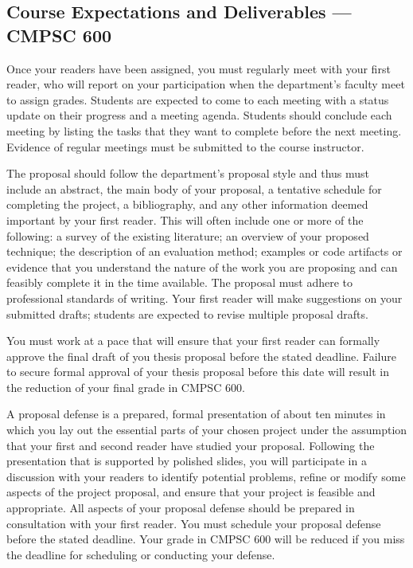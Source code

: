 \subsection*{Course Expectations and Deliverables --- CMPSC 600}

\medskip
{} Once your readers have been assigned, you must regularly meet with your first reader, who
will report on your participation when the department's faculty meet to assign grades.  Students are expected to come to
each meeting with a status update on their progress and a meeting agenda.  Students should conclude each meeting by
listing the tasks that they want to complete before the next meeting. Evidence of regular meetings must be submitted
to the course instructor. 

\medskip
{}
The proposal should follow the department's proposal style and thus must include an abstract, the main body of your
proposal, a tentative schedule for completing the project, a bibliography, and any other information deemed important by
your first reader. This will often include one or more of the following: a survey of the existing literature; an overview of
your proposed technique; the description of an evaluation method; examples or code artifacts or evidence that you
understand the nature of the work you are proposing and can feasibly complete it in the time available. 
The proposal must adhere to professional standards of writing. Your first reader will make suggestions on your submitted
drafts; students are expected to revise multiple proposal drafts.

% 
% 

You must work at a pace that will ensure that your first reader can formally approve the final draft of you thesis
proposal before the stated deadline.  Failure to secure formal approval of your thesis proposal before this date will
result in the reduction of your final grade in CMPSC 600.


\medskip
{}
A proposal defense is a prepared, formal presentation of about ten minutes in which you lay out the essential parts of
your chosen project under the assumption that your first and second reader have studied your proposal.  Following the
presentation that is supported by polished slides, you will participate in a discussion with your readers to identify
potential problems, refine or modify some aspects of the project proposal, and ensure that your project is feasible
and appropriate. All aspects of your proposal defense should be prepared in consultation with your first reader.
You must schedule your proposal defense before the stated deadline. Your grade in CMPSC 600 will be reduced if you miss the
deadline for scheduling or conducting your defense.

